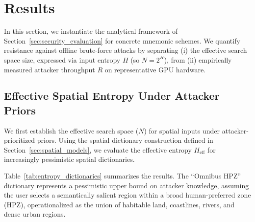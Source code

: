 \documentclass[journal,article,submit,pdftex,moreauthors]{Definitions/mdpi}
\begin{document}



\section{Results}
\label{sec:results}


In this section, we instantiate the analytical framework of Section~\ref{sec:security_evaluation} for concrete mnemonic schemes. We quantify resistance against offline brute-force attacks by separating (i) the effective search space size, expressed via input entropy $H$ (so $N = 2^{H}$), from (ii) empirically measured attacker throughput $R$ on representative GPU hardware.


\subsection{Effective Spatial Entropy Under Attacker Priors}
\label{sec:entropy_floors}

We first establish the effective search space ($N$) for spatial inputs under attacker-prioritized priors. Using the spatial dictionary construction defined in Section~\ref{sec:spatial_models}, we evaluate the effective entropy $H_{\text{eff}}$ for increasingly pessimistic spatial dictionaries.

Table~\ref{tab:entropy_dictionaries} summarizes the results. The ``Omnibus HPZ'' dictionary represents a pessimistic upper bound on attacker knowledge, assuming the user selects a semantically salient region within a broad human-preferred zone (HPZ), operationalized as the union of habitable land, coastlines, rivers, and dense urban regions.
\end{document}
